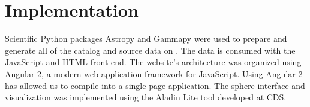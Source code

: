 \section{Implementation}

Scientific Python packages Astropy \cite{astropy} and Gammapy were used to prepare and generate all of the catalog and source data on \gammasky. The data is consumed with the JavaScript and HTML front-end. The website's architecture was organized using Angular 2, a modern web application framework for JavaScript. Using Angular 2 has allowed us to compile \gammasky into a single-page application. The sphere interface and visualization was implemented using the Aladin Lite tool \cite{aladin-lite} developed at CDS.
